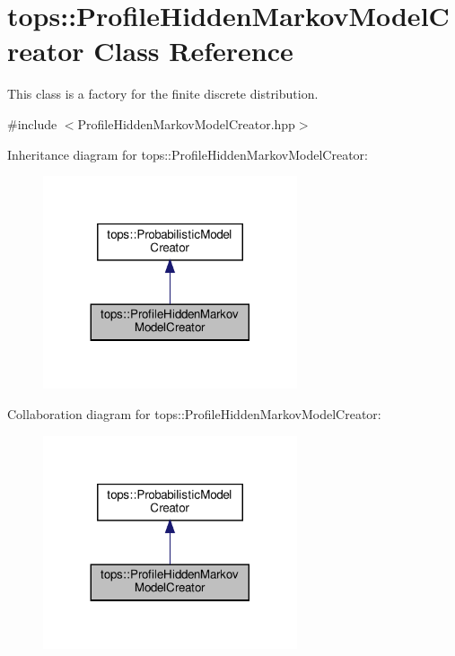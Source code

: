 \hypertarget{classtops_1_1ProfileHiddenMarkovModelCreator}{}\section{tops\+:\+:Profile\+Hidden\+Markov\+Model\+Creator Class Reference}
\label{classtops_1_1ProfileHiddenMarkovModelCreator}


This class is a factory for the finite discrete distribution.  




{\ttfamily \#include $<$Profile\+Hidden\+Markov\+Model\+Creator.\+hpp$>$}



Inheritance diagram for tops\+:\+:Profile\+Hidden\+Markov\+Model\+Creator\+:
\nopagebreak
\begin{figure}[H]
\begin{center}
\leavevmode
\includegraphics[width=212pt]{classtops_1_1ProfileHiddenMarkovModelCreator__inherit__graph}
\end{center}
\end{figure}


Collaboration diagram for tops\+:\+:Profile\+Hidden\+Markov\+Model\+Creator\+:
\nopagebreak
\begin{figure}[H]
\begin{center}
\leavevmode
\includegraphics[width=212pt]{classtops_1_1ProfileHiddenMarkovModelCreator__coll__graph}
\end{center}
\end{figure}

